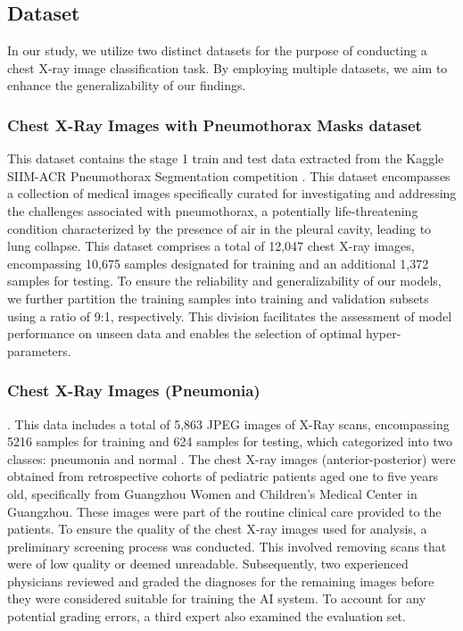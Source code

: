 \subsection{Dataset}
\label{subsec:dataset}
In our study, we utilize two distinct datasets for the purpose of conducting a chest X-ray image classification task. By employing multiple datasets, we aim to enhance the generalizability of our findings.


\subsubsection{Chest X-Ray Images with Pneumothorax Masks dataset}
\label{subsubsec:pneumothorax}
This dataset contains the stage 1 train and test data extracted from the Kaggle SIIM-ACR Pneumothorax Segmentation competition \cite{pneumothorax}. This dataset encompasses a collection of medical images specifically curated for investigating and addressing the challenges associated with pneumothorax, a potentially life-threatening condition characterized by the presence of air in the pleural cavity, leading to lung collapse. This dataset comprises a total of 12,047 chest X-ray images, encompassing 10,675 samples designated for training and an additional 1,372 samples for testing. To ensure the reliability and generalizability of our models, we further partition the training samples into training and validation subsets using a ratio of 9:1, respectively. This division facilitates the assessment of model performance on unseen data and enables the selection of optimal hyper-parameters.

\subsubsection{Chest X-Ray Images (Pneumonia)}.
\label{subsubsec:pneumonia}
This data includes a total of 5,863 JPEG images of X-Ray scans, encompassing 5216 samples for training and 624 samples for testing, which categorized into two classes: pneumonia and normal \cite{penumonia}. The chest X-ray images (anterior-posterior) were obtained from retrospective cohorts of pediatric patients aged one to five years old, specifically from Guangzhou Women and Children’s Medical Center in Guangzhou. These images were part of the routine clinical care provided to the patients. To ensure the quality of the chest X-ray images used for analysis, a preliminary screening process was conducted. This involved removing scans that were of low quality or deemed unreadable. Subsequently, two experienced physicians reviewed and graded the diagnoses for the remaining images before they were considered suitable for training the AI system. To account for any potential grading errors, a third expert also examined the evaluation set.
